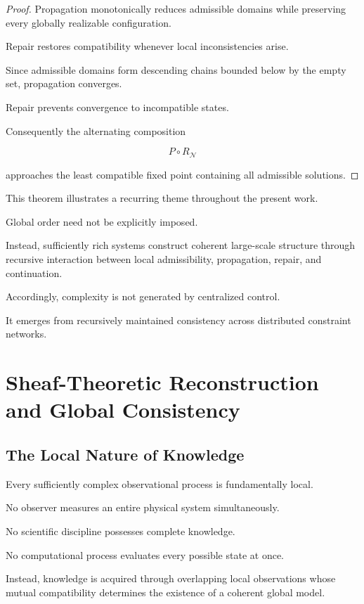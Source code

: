 \documentclass[11pt,oneside]{book}
\numberwithin{equation}{chapter}
\theoremstyle{definition}
\theoremstyle{plain}
\begin{document}
\begin{proof}

Propagation monotonically reduces admissible domains while preserving every
globally realizable configuration.

Repair restores compatibility whenever local inconsistencies arise.

Since admissible domains form descending chains bounded below by the empty
set, propagation converges.

Repair prevents convergence to incompatible states.

Consequently the alternating composition

\[
P
\circ
R_{\mathcal{N}}
\]

approaches the least compatible fixed point containing all admissible
solutions.

\end{proof}

This theorem illustrates a recurring theme throughout the present work.

Global order need not be explicitly imposed.

Instead, sufficiently rich systems construct coherent large-scale structure
through recursive interaction between local admissibility, propagation,
repair, and continuation.

Accordingly, complexity is not generated by centralized control.

It emerges from recursively maintained consistency across distributed
constraint networks.

\chapter{Sheaf-Theoretic Reconstruction and Global Consistency}

\section{The Local Nature of Knowledge}

Every sufficiently complex observational process is fundamentally local.

No observer measures an entire physical system simultaneously.

No scientific discipline possesses complete knowledge.

No computational process evaluates every possible state at once.

Instead, knowledge is acquired through overlapping local observations whose
mutual compatibility determines the existence of a coherent global model.
\end{document}
